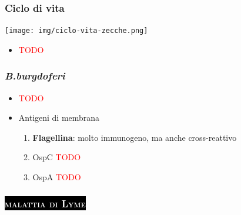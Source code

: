 \documentclass[italian,]{article}
\providecommand{\tightlist}{%
  \setlength{\itemsep}{0pt}\setlength{\parskip}{0pt}}
\newcommand{\pat}[1]{\colorbox{black}{\textcolor{white}{\textsc{#1}}}}
\newcommand{\TODO}[1]{\textcolor{red}{\textsf{\footnotesize{TODO #1}}}} %
\begin{document}
\hypertarget{ciclo-di-vita}{%
\subsubsection{Ciclo di vita}\label{ciclo-di-vita}}

\texttt{[image: img/ciclo-vita-zecche.png]}~

\begin{itemize}
\item
  \TODO{}
\end{itemize}

\hypertarget{b.burgdoferi}{%
\subsubsection{\texorpdfstring{\emph{B.burgdoferi}}{B.burgdoferi}}\label{b.burgdoferi}}

\begin{itemize}
\item
  \TODO{}
\item
  Antigeni di membrana

  \begin{enumerate}
  \def\labelenumi{\arabic{enumi}.}
  \tightlist
  \item
    \textbf{Flagellina}: molto immunogeno, ma anche cross-reattivo
  \item
    OspC \TODO{}
  \item
    OspA \TODO{}
  \end{enumerate}
\end{itemize}

\hypertarget{section-8}{%
\subsubsection{\texorpdfstring{\pat{malattia di Lyme}}{}}\label{section-8}}
\end{document}
